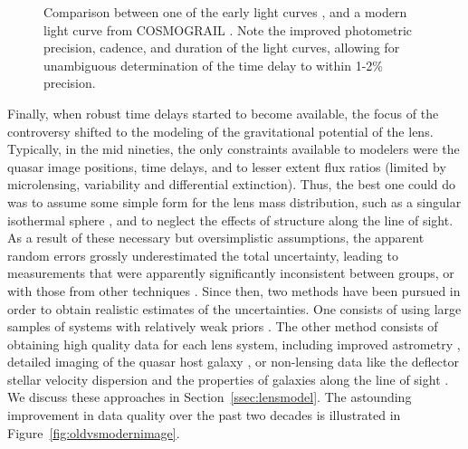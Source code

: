\begin{figure}
\begin{minipage}{0.48\linewidth}
\end{minipage}
\caption{Comparison between one of the early light curves \citep[left
panel, from][]{Van89}, and a modern light curve from COSMOGRAIL
\citep[right panel, from][]{Tew++13}. Note the improved photometric
precision, cadence, and duration of the light curves, allowing for
unambiguous determination of the time delay to within 1-2\% precision.}
\label{fig:oldvsmoderndt}
\end{figure}

Finally, when robust time delays started to become available, the
focus of the controversy shifted to the modeling of the gravitational
potential of the lens. Typically, in the mid nineties, the only
constraints available to modelers were the quasar image positions,
time delays, and to lesser extent flux ratios (limited by
microlensing, variability and differential extinction). Thus, the best
one could do was to assume some simple form for the lens mass
distribution, such as a singular isothermal sphere \citep{K+F99},
and to neglect the
effects of structure along the line of sight. As a result of these necessary
but oversimplistic assumptions, the apparent random errors grossly underestimated
the total uncertainty, leading to measurements that were apparently
significantly inconsistent
between groups, or with those from other techniques
\citep{K+S04}. Since then, two methods have been pursued in order to
obtain realistic estimates of the uncertainties. One consists of using
large samples of systems with relatively weak priors
\citep{Ogu07b}. The other method consists of obtaining high quality data for
each lens system, including improved astrometry \citep{Cou++97}, detailed imaging of
the quasar host galaxy
\citep{Keeton:2000p241,KKM01,Koo++03,WBB04,Suy++06}, or non-lensing data like the deflector
stellar velocity dispersion \citep{T+K02b} and the properties of
galaxies along the line of sight \citep{K+Z04,Suy++10}. We discuss
these approaches in Section~\ref{ssec:lensmodel}. The astounding
improvement in data quality over the past two decades is illustrated
in Figure~\ref{fig:oldvsmodernimage}.

